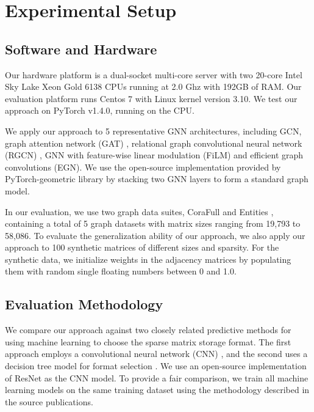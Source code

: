 \vspace{-2mm}
\section{Experimental Setup}
\vspace{-2mm}
\subsection{Software and Hardware} \label{sec:platform}
\vspace{-3mm}
  Our hardware platform is a dual-socket multi-core server with two 20-core Intel Sky Lake Xeon Gold 6138
CPUs running at 2.0 Ghz with 192GB of RAM.
 Our evaluation platform runs Centos 7 with Linux kernel version 3.10. We test our approach on PyTorch
v1.4.0, running on the CPU.

We apply our approach to 5 representative GNN architectures, including GCN, graph attention network (GAT)
\cite{gat2018graph}, relational graph convolutional neural network (RGCN) \cite{schlichtkrull2018modeling}, GNN with feature-wise linear
modulation (FiLM) \cite{brockschmidt2020gnn} and efficient graph convolutions (EGN)\cite{tailor2021adaptive}. We use the open-source
implementation provided by PyTorch-geometric library \cite{fey2019fast} by stacking two GNN layers to form a standard graph model.

 In our evaluation, we use two graph data suites, CoraFull \cite{xu2019crosslingual} and Entities \cite{schlichtkrull2018modeling}, containing a
total of 5 graph datasets with matrix sizes ranging from 19,793 to 58,086. To evaluate the generalization ability of our approach, we also
apply our approach to 100 synthetic matrices of different sizes and sparsity. For the synthetic data, we initialize weights in the adjacency matrices
by populating them with random single floating numbers between 0 and 1.0.

\vspace{-3mm}
\subsection{Evaluation Methodology\label{sec:priorwork}}
\vspace{-3mm}  We compare our approach against two closely related predictive methods for using machine
learning to choose the sparse matrix storage format. The first approach employs a convolutional neural network (CNN)
\cite{zhao2018bridging,pichel2019sparse}, and the second uses a decision tree model for format selection \cite{sedaghati2015automatic}. We
use an open-source implementation of ResNet \cite{paszke2019pytorch} as the CNN model.  To provide a fair comparison, we train all machine
learning models on the same training dataset using the methodology described in the source publications.

